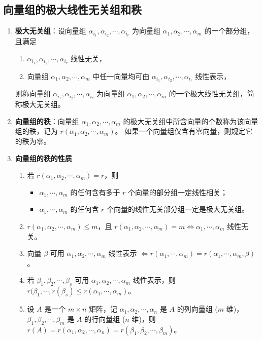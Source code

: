 \documentclass[UTF8]{ctexart}
\theoremstyle{mydef}
\begin{document}
\subsection{向量组的极大线性无关组和秩}

\begin{enumerate}
    \item \textbf{极大无关组}：设向量组 $\alpha_{i_1}, \alpha_{i_2}, \cdots, \alpha_{i_r}$ 为向量组 $\alpha_1, \alpha_2, \cdots, \alpha_m$ 的一个部分组，且满足
    \begin{enumerate}
        \item $\alpha_{i_1}, \alpha_{i_2}, \cdots, \alpha_{i_r}$ 线性无关，
        \item 向量组 $\alpha_1, \alpha_2, \cdots, \alpha_m$ 中任一向量均可由 $\alpha_{i_1}, \alpha_{i_2}, \cdots, \alpha_{i_r}$ 线性表示，
    \end{enumerate}
    则称向量组 $\alpha_{i_1}, \alpha_{i_2}, \cdots, \alpha_{i_r}$ 为向量组 $\alpha_1, \alpha_2, \cdots, \alpha_m$ 的一个极大线性无关组，简称极大无关组。

    \item \textbf{向量组的秩}：向量组 $\alpha_1, \alpha_2, \cdots, \alpha_m$ 的极大无关组中所含向量的个数称为该向量组的秩，记为 $r(\alpha_1, \alpha_2, \cdots, \alpha_m)$。
    如果一个向量组仅含有零向量，则规定它的秩为零。

    \item \textbf{向量组的秩的性质}
    \begin{enumerate}
        \item 若 $r(\alpha_1, \alpha_2, \cdots, \alpha_m) = r$，则
        \begin{itemize}
            \item $\alpha_1, \cdots, \alpha_m$ 的任何含有多于 $r$ 个向量的部分组一定线性相关；
            \item $\alpha_1, \cdots, \alpha_m$ 的任何含 $r$ 个向量的线性无关部分组一定是极大无关组。
        \end{itemize}
        \item $r(\alpha_1, \alpha_2, \cdots, \alpha_m) \le m$，且 $r(\alpha_1, \alpha_2, \cdots, \alpha_m) = m \iff \alpha_1, \cdots, \alpha_m$ 线性无关。
        \item 向量 $\beta$ 可用 $\alpha_1, \alpha_2, \cdots, \alpha_m$ 线性表示 $\iff r(\alpha_1, \cdots, \alpha_m) = r(\alpha_1, \cdots, \alpha_m, \beta)$。
        \item 若 $\beta_1, \beta_2, \cdots, \beta_s$ 可用 $\alpha_1, \alpha_2, \cdots, \alpha_m$ 线性表示，则 $r(\beta_1, \cdots, r(\beta_s) \le r(\alpha_1, \cdots, \alpha_m)$。
        \item 设 $A$ 是一个 $m \times n$ 矩阵，记 $\alpha_1, \alpha_2, \cdots, \alpha_n$ 是 $A$ 的列向量组 ($m$ 维)，$\beta_1, \beta_2, \cdots, \beta_m$ 是 $A$ 的行向量组 ($n$ 维)，则 $r(A) = r(\alpha_1, \alpha_2, \cdots, \alpha_n) = r(\beta_1, \beta_2, \cdots, \beta_m)$。
    \end{enumerate}


\end{enumerate}
\end{document}

